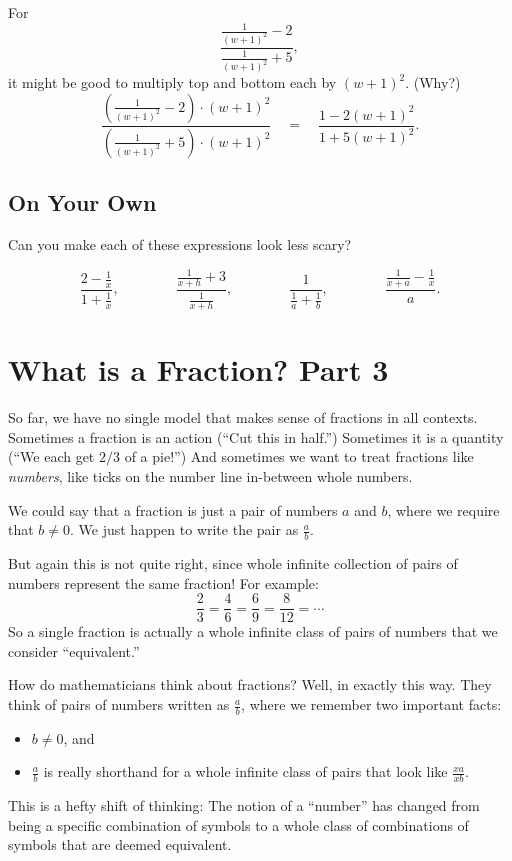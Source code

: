 \begin{example}
For 
\[
\frac{\frac 1 {(w+1)^2} - 2}{\frac 1 {(w+1)^2} +5},
\]
it might be good to multiply top and bottom each by $(w+1)^2$.  (Why?)
\[
\frac{\left(\frac 1 {(w+1)^2} - 2\right)\cdot (w+1)^2}{\left(\frac 1 {(w+1)^2} +5\right)\cdot (w+1)^2}
\quad
=
\quad
\frac{1 - 2(w+1)^2}{1+5(w+1)^2}.
\]


\end{example}

\subsection*{On Your Own}
Can you make each of these expressions look less scary?

\[
\frac{2-\frac 1 x}{1 + \frac 1 x},
\qquad\qquad
\frac{\frac1{x+h} + 3}{\frac 1{x+h}},
\qquad\qquad
\frac{1}{\frac 1 a + \frac 1 b},
\qquad\qquad
\frac{\frac{1}{x+a} - \frac 1 x} a.
\]






\section{What is a Fraction? Part 3}
So far, we have no single model that makes sense of fractions in all contexts.  Sometimes a fraction is an action (``Cut this in half.'')  Sometimes it is a quantity (``We each get $2/3$ of a pie!'')  And sometimes we want to treat fractions like \emph{numbers}, like ticks on the number line in-between whole numbers.

We could say that a fraction is just a pair of numbers $a$ and $b$, where we require that $b \neq 0$.  We just happen to write the pair as $\frac a b$.  

But again this is not quite right, since whole infinite collection of pairs of numbers represent
the same fraction!  For example:
\[
\frac 2 3 = \frac 4 6 = \frac 6 9 = \frac 8 {12} = \cdots
\]
 So a single fraction is actually a
whole infinite class of pairs of numbers that we consider ``equivalent.''
 


How do mathematicians think about fractions?  Well, in exactly this way.  They think of pairs of numbers written as $\frac a b$, where we remember two important facts:
\begin{itemize}
\item
$b \neq 0$, and
\item
$\frac a b$ is really shorthand for a whole infinite class of pairs that look like $\frac{xa}{xb}$.

\end{itemize}
This is a hefty shift of thinking: The notion of a ``number'' has changed from being a
specific combination of symbols to a whole class of combinations of
symbols that are deemed equivalent.


